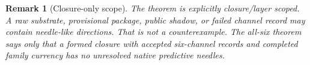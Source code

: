 \documentclass[11pt]{article}
\newtheorem{remark}{Remark}
\begin{document}
\begin{remark}[Closure-only scope]
The theorem is explicitly closure/layer scoped.  A raw substrate, provisional package, public shadow, or failed channel record may contain needle-like directions.  That is not a counterexample.  The all-six theorem says only that a formed closure with accepted six-channel records and completed family currency has no unresolved native predictive needles.
\end{remark}
\end{document}

